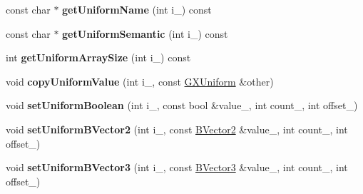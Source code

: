 \begin{DoxyCompactItemize}
\item 
const char $\ast$ {\bfseries get\+Uniform\+Name} (int i\+\_\+) const \hypertarget{class_i_dream_sky_1_1_g_x_shader_program2_a454b126f5daf9bd97fc3822991a1c6d6}{}\label{class_i_dream_sky_1_1_g_x_shader_program2_a454b126f5daf9bd97fc3822991a1c6d6}

\item 
const char $\ast$ {\bfseries get\+Uniform\+Semantic} (int i\+\_\+) const \hypertarget{class_i_dream_sky_1_1_g_x_shader_program2_a09f04f84642a99ff74c3b457cc0fab1e}{}\label{class_i_dream_sky_1_1_g_x_shader_program2_a09f04f84642a99ff74c3b457cc0fab1e}

\item 
int {\bfseries get\+Uniform\+Array\+Size} (int i\+\_\+) const \hypertarget{class_i_dream_sky_1_1_g_x_shader_program2_a3db9a9520270ee52fe5b08880e5b2783}{}\label{class_i_dream_sky_1_1_g_x_shader_program2_a3db9a9520270ee52fe5b08880e5b2783}

\item 
void {\bfseries copy\+Uniform\+Value} (int i\+\_\+, const \hyperlink{class_i_dream_sky_1_1_g_x_uniform}{G\+X\+Uniform} \&other)\hypertarget{class_i_dream_sky_1_1_g_x_shader_program2_ab6f82c0f5921dad319fdf1014c203fd9}{}\label{class_i_dream_sky_1_1_g_x_shader_program2_ab6f82c0f5921dad319fdf1014c203fd9}

\item 
void {\bfseries set\+Uniform\+Boolean} (int i\+\_\+, const bool \&value\+\_\+, int count\+\_, int offset\+\_)\hypertarget{class_i_dream_sky_1_1_g_x_shader_program2_a78c280f4637145d2cb8e652642bdb215}{}\label{class_i_dream_sky_1_1_g_x_shader_program2_a78c280f4637145d2cb8e652642bdb215}

\item 
void {\bfseries set\+Uniform\+B\+Vector2} (int i\+\_\+, const \hyperlink{class_i_dream_sky_1_1_b_vector2}{B\+Vector2} \&value\+\_\+, int count\+\_, int offset\+\_)\hypertarget{class_i_dream_sky_1_1_g_x_shader_program2_a5e9bf87c2490c7ffddaba347eb4b8dcb}{}\label{class_i_dream_sky_1_1_g_x_shader_program2_a5e9bf87c2490c7ffddaba347eb4b8dcb}

\item 
void {\bfseries set\+Uniform\+B\+Vector3} (int i\+\_\+, const \hyperlink{class_i_dream_sky_1_1_b_vector3}{B\+Vector3} \&value\+\_\+, int count\+\_, int offset\+\_)\hypertarget{class_i_dream_sky_1_1_g_x_shader_program2_ac4da2d0354a2f0e8596d32de9899dcae}{}\label{class_i_dream_sky_1_1_g_x_shader_program2_ac4da2d0354a2f0e8596d32de9899dcae}


\end{DoxyCompactItemize}
